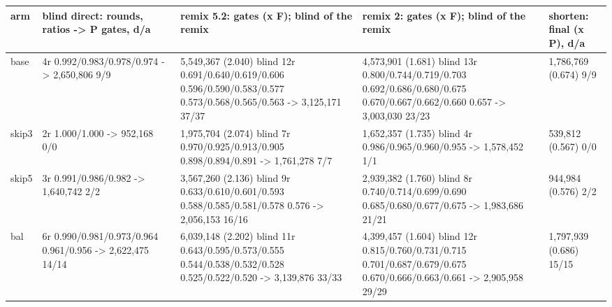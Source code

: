 \documentclass[10pt,a4paper]{article}
\begin{document}
{\small\setlength{\tabcolsep}{2pt}\begin{longtable}{|p{1.1cm}|p{3.15cm}|p{4.77cm}|p{4.77cm}|p{1.74cm}|}\hline
\textbf{arm} & \textbf{blind direct: rounds, ratios -\textgreater{} P gates, d/\allowbreak{}a} & \textbf{remix 5.2: gates (x F); blind of the remix} & \textbf{remix 2: gates (x F); blind of the remix} & \textbf{shorten: final (x P), d/\allowbreak{}a}\\\hline\endhead
base & 4r 0.992/\allowbreak{}0.983/\allowbreak{}0.978/\allowbreak{}0.974 -\textgreater{} 2,650,806 9/\allowbreak{}9 & 5,549,367 (2.040) blind 12r 0.691/\allowbreak{}0.640/\allowbreak{}0.619/\allowbreak{}0.606 0.596/\allowbreak{}0.590/\allowbreak{}0.583/\allowbreak{}0.577 0.573/\allowbreak{}0.568/\allowbreak{}0.565/\allowbreak{}0.563 -\textgreater{} 3,125,171 37/\allowbreak{}37 & 4,573,901 (1.681) blind 13r 0.800/\allowbreak{}0.744/\allowbreak{}0.719/\allowbreak{}0.703 0.692/\allowbreak{}0.686/\allowbreak{}0.680/\allowbreak{}0.675 0.670/\allowbreak{}0.667/\allowbreak{}0.662/\allowbreak{}0.660 0.657 -\textgreater{} 3,003,030 23/\allowbreak{}23 & 1,786,769 (0.674) 9/\allowbreak{}9\\\hline
skip3 & 2r 1.000/\allowbreak{}1.000 -\textgreater{} 952,168 0/\allowbreak{}0 & 1,975,704 (2.074) blind 7r 0.970/\allowbreak{}0.925/\allowbreak{}0.913/\allowbreak{}0.905 0.898/\allowbreak{}0.894/\allowbreak{}0.891 -\textgreater{} 1,761,278 7/\allowbreak{}7 & 1,652,357 (1.735) blind 4r 0.986/\allowbreak{}0.965/\allowbreak{}0.960/\allowbreak{}0.955 -\textgreater{} 1,578,452 1/\allowbreak{}1 & 539,812 (0.567) 0/\allowbreak{}0\\\hline
skip5 & 3r 0.991/\allowbreak{}0.986/\allowbreak{}0.982 -\textgreater{} 1,640,742 2/\allowbreak{}2 & 3,567,260 (2.136) blind 9r 0.633/\allowbreak{}0.610/\allowbreak{}0.601/\allowbreak{}0.593 0.588/\allowbreak{}0.585/\allowbreak{}0.581/\allowbreak{}0.578 0.576 -\textgreater{} 2,056,153 16/\allowbreak{}16 & 2,939,382 (1.760) blind 8r 0.740/\allowbreak{}0.714/\allowbreak{}0.699/\allowbreak{}0.690 0.685/\allowbreak{}0.680/\allowbreak{}0.677/\allowbreak{}0.675 -\textgreater{} 1,983,686 21/\allowbreak{}21 & 944,984 (0.576) 2/\allowbreak{}2\\\hline
bal & 6r 0.990/\allowbreak{}0.981/\allowbreak{}0.973/\allowbreak{}0.964 0.961/\allowbreak{}0.956 -\textgreater{} 2,622,475 14/\allowbreak{}14 & 6,039,148 (2.202) blind 11r 0.643/\allowbreak{}0.595/\allowbreak{}0.573/\allowbreak{}0.555 0.544/\allowbreak{}0.538/\allowbreak{}0.532/\allowbreak{}0.528 0.525/\allowbreak{}0.522/\allowbreak{}0.520 -\textgreater{} 3,139,876 33/\allowbreak{}33 & 4,399,457 (1.604) blind 12r 0.815/\allowbreak{}0.760/\allowbreak{}0.731/\allowbreak{}0.715 0.701/\allowbreak{}0.687/\allowbreak{}0.679/\allowbreak{}0.675 0.670/\allowbreak{}0.666/\allowbreak{}0.663/\allowbreak{}0.661 -\textgreater{} 2,905,958 29/\allowbreak{}29 & 1,797,939 (0.686) 15/\allowbreak{}15\\\hline

\end{longtable}}
\end{document}
